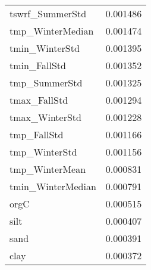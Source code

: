\begin{tabular}{lr}
tswrf_SummerStd & 0.001486 \\
tmp_WinterMedian & 0.001474 \\
tmin_WinterStd & 0.001395 \\
tmin_FallStd & 0.001352 \\
tmp_SummerStd & 0.001325 \\
tmax_FallStd & 0.001294 \\
tmax_WinterStd & 0.001228 \\
tmp_FallStd & 0.001166 \\
tmp_WinterStd & 0.001156 \\
tmp_WinterMean & 0.000831 \\
tmin_WinterMedian & 0.000791 \\
orgC & 0.000515 \\
silt & 0.000407 \\
sand & 0.000391 \\
clay & 0.000372 \\
\bottomrule
\end{tabular}
